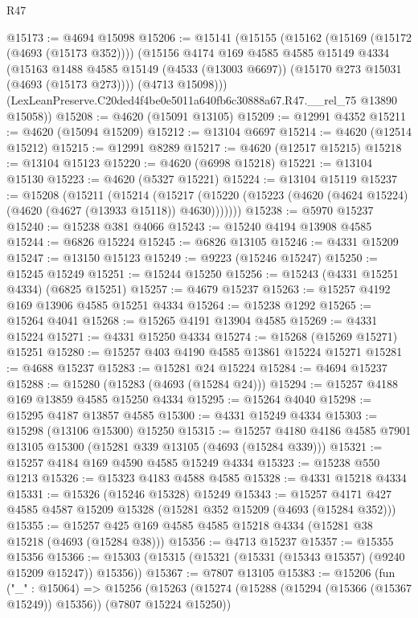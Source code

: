 \begin{lexlean}{R47}
\begin{coremodule}
@15173 := @4694 @15098
@15206 := @15141
    (@15155
      (@15162
        (@15169 (@15172 (@4693 (@15173 @352))))
        (@15156
          @4174
          @169
          @4585
          @4585
          @15149
          @4334
          (@15163
            @1488
            @4585
            @15149
            (@4533 (@13003 @6697))
            (@15170 @273 @15031 (@4693 (@15173 @273))))
          (@4713 @15098)))
      (LexLeanPreserve.C20ded4f4be0e5011a640fb6c30888a67.R47.__rel_75 @13890 @15058))
@15208 := @4620 (@15091 @13105)
@15209 := @12991 @4352
@15211 := @4620 (@15094 @15209)
@15212 := @13104 @6697
@15214 := @4620 (@12514 @15212)
@15215 := @12991 @8289
@15217 := @4620 (@12517 @15215)
@15218 := @13104 @15123
@15220 := @4620 (@6998 @15218)
@15221 := @13104 @15130
@15223 := @4620 (@5327 @15221)
@15224 := @13104 @15119
@15237 := @15208
    (@15211
      (@15214
        (@15217 (@15220 (@15223 (@4620 (@4624 @15224) (@4620 (@4627 (@13933 @15118)) @4630)))))))
@15238 := @5970 @15237
@15240 := @15238 @381 @4066
@15243 := @15240 @4194 @13908 @4585
@15244 := @6826 @15224
@15245 := @6826 @13105
@15246 := @4331 @15209
@15247 := @13150 @15123
@15249 := @9223 (@15246 @15247)
@15250 := @15245 @15249
@15251 := @15244 @15250
@15256 := @15243 (@4331 @15251 @4334) (@6825 @15251)
@15257 := @4679 @15237
@15263 := @15257 @4192 @169 @13906 @4585 @15251 @4334
@15264 := @15238 @1292
@15265 := @15264 @4041
@15268 := @15265 @4191 @13904 @4585
@15269 := @4331 @15224
@15271 := @4331 @15250 @4334
@15274 := @15268 (@15269 @15271) @15251
@15280 := @15257 @403 @4190 @4585 @13861 @15224 @15271
@15281 := @4688 @15237
@15283 := @15281 @24 @15224
@15284 := @4694 @15237
@15288 := @15280 (@15283 (@4693 (@15284 @24)))
@15294 := @15257 @4188 @169 @13859 @4585 @15250 @4334
@15295 := @15264 @4040
@15298 := @15295 @4187 @13857 @4585
@15300 := @4331 @15249 @4334
@15303 := @15298 (@13106 @15300) @15250
@15315 := @15257 @4180 @4186 @4585 @7901 @13105 @15300 (@15281 @339 @13105 (@4693 (@15284 @339)))
@15321 := @15257 @4184 @169 @4590 @4585 @15249 @4334
@15323 := @15238 @550 @1213
@15326 := @15323 @4183 @4588 @4585
@15328 := @4331 @15218 @4334
@15331 := @15326 (@15246 @15328) @15249
@15343 := @15257 @4171 @427 @4585 @4587 @15209 @15328 (@15281 @352 @15209 (@4693 (@15284 @352)))
@15355 := @15257 @425 @169 @4585 @4585 @15218 @4334 (@15281 @38 @15218 (@4693 (@15284 @38)))
@15356 := @4713 @15237
@15357 := @15355 @15356
@15366 := @15303 (@15315 (@15321 (@15331 (@15343 @15357) (@9240 @15209 @15247)) @15356))
@15367 := @7807 @13105
@15383 := @15206
    (fun ("_" : @15064) =>
    @15256
      (@15263
        (@15274 (@15288 (@15294 (@15366 (@15367 @15249)) @15356)) (@7807 @15224 @15250))

\end{coremodule}
\end{lexlean}
